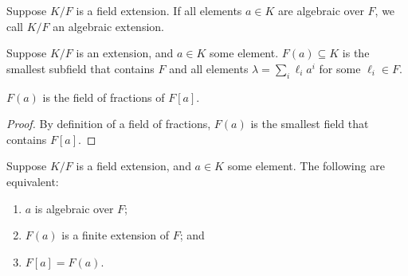 \begin{definition}
    Suppose \(K/F\) is a field extension.
    If all elements \(a \in K\) are algebraic over \(F\),
    we call \(K/F\) an algebraic extension.
\end{definition}
\begin{definition}
    Suppose \(K/F\) is an extension, and \(a \in K\) some element.
    \(F(a) \subseteq K\) is the smallest subfield that contains \(F\)
    and all elements \(\lambda = \sum_i \ell_i a^i\) for some \(\ell_i \in F\).
\end{definition}
\begin{proposition}
    \(F(a)\) is the field of fractions of \(F[a]\).
\end{proposition}
\begin{proof}
    By definition of a field of fractions,
    \(F(a)\) is the smallest field that contains \(F[a]\).
\end{proof}
\begin{theorem}\label{thm:algebraic-finite-extension}
    Suppose \(K/F\) is a field extension, and \(a \in K\) some element.
    The following are equivalent:
    \begin{enumerate}[label={(\alph*)}, itemsep=0mm]
        \item \(a\) is algebraic over \(F\);
        \item \(F(a)\) is a finite extension of \(F\); and
        \item \(F[a] = F(a)\).
    \end{enumerate}
\end{theorem}
